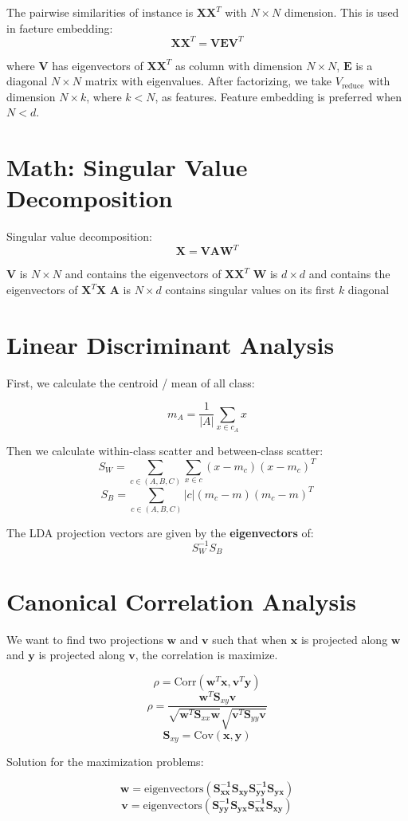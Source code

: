 \begin{multicols*}{2}
\noindent The pairwise similarities of instance is $\mathbf{X} \mathbf{X}^{T}$ with $N\times N$ dimension. This is used in faeture embedding:
$$\mathbf{X} \mathbf{X}^{T} = \mathbf{VEV}^{T}$$

\noindent where $\mathbf{V}$ has eigenvectors of $\mathbf{X} \mathbf{X}^{T}$ as column with dimension $N\times N$, $\mathbf{E}$ is a diagonal $N\times N$ matrix with eigenvalues. After factorizing, we take $V_{\text{reduce}}$ with dimension $N\times k$, where $k<N$, as features. Feature embedding is preferred when $N<d$. 

\section{Math: Singular Value Decomposition}
\noindent Singular value decomposition:
$$\mathbf{X} = \mathbf{VAW}^{T}$$

\noindent $\mathbf{V}$ is $N\times N$ and contains the eigenvectors of $\mathbf{XX}^T$
\noindent $\mathbf{W}$ is $d\times d$ and contains the eigenvectors of $\mathbf{X}^T \mathbf{X}$
\noindent $\mathbf{A}$ is $N\times d$ contains singular values on its first $k$ diagonal

\section{Linear Discriminant Analysis}

\noindent First, we calculate the centroid / mean of all class:

$$m_A = \frac{1}{|A|} \sum_{x \in c_A} x$$

\noindent Then we calculate within-class scatter and between-class scatter:
$$S_W = \sum_{c \in (A,B,C)} \sum_{x \in c} (x-m_c)(x-m_c)^{T}$$
$$S_B = \sum_{c \in (A,B,C)} |c| (m_c - m)(m_c - m)^T$$

\noindent The LDA projection vectors are given by the \textbf{eigenvectors} of:
$$S_W^{-1}S_B$$

\section{Canonical Correlation Analysis}

\noindent We want to find two projections $\mathbf{w}$ and $\mathbf{v}$ such that when $\mathbf{x}$ is projected along $\mathbf{w}$ and $\mathbf{y}$ is projected along $\mathbf{v}$, the correlation is maximize. 

$$\rho = \text{Corr}(\mathbf{w}^T \mathbf{x}, \mathbf{v}^T \mathbf{y})$$
$$\rho = \frac{\mathbf{w}^T\mathbf{S}_{xy}\mathbf{v}}{\sqrt{\mathbf{w}^T\mathbf{S}_{xx}\mathbf{w}}\sqrt{\mathbf{v}^T\mathbf{S}_{yy}\mathbf{v}}}$$
$$\mathbf{S}_{xy} = \text{Cov}(\mathbf{x},\mathbf{y})$$

\noindent Solution for the maximization problems:

$$\mathbf{w} = \text{eigenvectors}(\mathbf{S_{xx}^{-1}S_{xy}S_{yy}^{-1}S_{yx}})$$
$$\mathbf{v} = \text{eigenvectors}(\mathbf{S_{yy}^{-1}S_{yx}S_{xx}^{-1}S_{xy}})$$

\end{multicols*}
